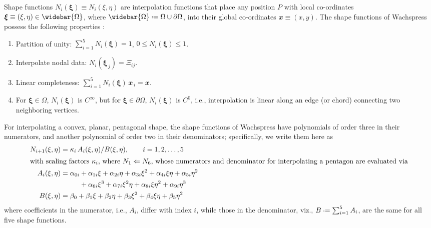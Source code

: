 Shape functions $N_i (\boldsymbol{\xi}) \equiv N_i (\xi, \eta)$ are interpolation functions that place any position $P$ with local co-ordinates $\boldsymbol{\xi} \equiv (\xi, \eta) \in \widebar{\Omega}$, where $\widebar{\Omega} \defeq \Omega \cup \partial\Omega$, into their global co-ordinates $\mathbfit{x} \equiv (x,y)$.  The shape functions of Wachspress \cite{Wachspress75,Wachspress16} possess the following properties \cite{SukumarMalsch06}:
\begin{enumerate}
	\item Partition of unity: $\sum\nolimits_{i=1}^5 N_i (\boldsymbol{\xi}) = 1$, \; $0 \leq N_i (\boldsymbol{\xi}) \leq 1$.
	\item Interpolate nodal data: $N_i (\boldsymbol{\xi}_{\,j}) = \Xi_{ij}$.
	\item Linear completeness: $\sum\nolimits_{i=1}^5 N_i (\boldsymbol{\xi}) \, \mathbfit{x}_{\,i} = \mathbfit{x}$.
	\item For $\boldsymbol{\xi} \in \Omega$, $N_i (\boldsymbol{\xi})$ is $C^{\infty}$, but for $\boldsymbol{\xi} \in \partial \Omega$, $N_i (\boldsymbol{\xi})$ is $C^0$, i.e., interpolation is linear along an edge (or chord) connecting two neighboring vertices. 
\end{enumerate}

For interpolating a convex, planar, pentagonal shape, the shape functions of Wachspress have polynomials of order three in their numerators, and another polynomial of order two in their denominators; specifically, we write them here as
\begin{subequations}
	\label{shapeFunctions}
	\begin{align}
	N_{i+1} (\xi, \eta) & = \kappa_i \, A_i (\xi, \eta) / B(\xi, \eta) , 
	\qquad i = 1, 2 , \dots , 5 \\ 
	\intertext{with scaling factors $\kappa_i$, where $N_1 \Leftarrow N_6$, whose numerators and denominator for interpolating a pentagon are evaluated via}
	A_i (\xi, \eta) & = \alpha_{0i} + \alpha_{1i} \xi + \alpha_{2i} \eta + 
	\alpha_{3i} \xi^2 + \alpha_{4i} \xi\eta + \alpha_{5i} \eta^2 \notag \\ 
	\mbox{} & \phantom{\mbox{} = \alpha_{0i}} + \alpha_{6i} \xi^3 + 
	\alpha_{7i} \xi^2 \eta + \alpha_{8i} \xi \eta^2 + \alpha_{9i} \eta^3
	\label{shapeFnNum} \\
	B (\xi, \eta) & = \beta_0 + \beta_1 \xi + \beta_2 \eta + \beta_3 \xi^2 + 
	\beta_4 \xi\eta + \beta_5 \eta^2 
	\label{shapeFnDenom}
	\end{align}
\end{subequations}
where coefficients in the numerator, i.e., $A_i$, differ with index $i$, while those in the denominator, viz., $B \defeq \sum_{i=1}^5 A_i$, are the same for all five shape functions.  

